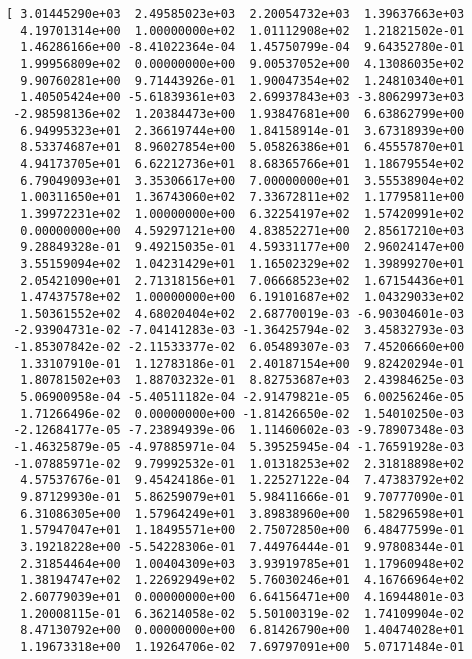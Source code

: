 \documentclass[11pt]{article}
\begin{document}
    \begin{Verbatim}[commandchars=\\\{\}]
[ 3.01445290e+03  2.49585023e+03  2.20054732e+03  1.39637663e+03
  4.19701314e+00  1.00000000e+02  1.01112908e+02  1.21821502e-01
  1.46286166e+00 -8.41022364e-04  1.45750799e-04  9.64352780e-01
  1.99956809e+02  0.00000000e+00  9.00537052e+00  4.13086035e+02
  9.90760281e+00  9.71443926e-01  1.90047354e+02  1.24810340e+01
  1.40505424e+00 -5.61839361e+03  2.69937843e+03 -3.80629973e+03
 -2.98598136e+02  1.20384473e+00  1.93847681e+00  6.63862799e+00
  6.94995323e+01  2.36619744e+00  1.84158914e-01  3.67318939e+00
  8.53374687e+01  8.96027854e+00  5.05826386e+01  6.45557870e+01
  4.94173705e+01  6.62212736e+01  8.68365766e+01  1.18679554e+02
  6.79049093e+01  3.35306617e+00  7.00000000e+01  3.55538904e+02
  1.00311650e+01  1.36743060e+02  7.33672811e+02  1.17795811e+00
  1.39972231e+02  1.00000000e+00  6.32254197e+02  1.57420991e+02
  0.00000000e+00  4.59297121e+00  4.83852271e+00  2.85617210e+03
  9.28849328e-01  9.49215035e-01  4.59331177e+00  2.96024147e+00
  3.55159094e+02  1.04231429e+01  1.16502329e+02  1.39899270e+01
  2.05421090e+01  2.71318156e+01  7.06668523e+02  1.67154436e+01
  1.47437578e+02  1.00000000e+00  6.19101687e+02  1.04329033e+02
  1.50361552e+02  4.68020404e+02  2.68770019e-03 -6.90304601e-03
 -2.93904731e-02 -7.04141283e-03 -1.36425794e-02  3.45832793e-03
 -1.85307842e-02 -2.11533377e-02  6.05489307e-03  7.45206660e+00
  1.33107910e-01  1.12783186e-01  2.40187154e+00  9.82420294e-01
  1.80781502e+03  1.88703232e-01  8.82753687e+03  2.43984625e-03
  5.06900958e-04 -5.40511182e-04 -2.91479821e-05  6.00256246e-05
  1.71266496e-02  0.00000000e+00 -1.81426650e-02  1.54010250e-03
 -2.12684177e-05 -7.23894939e-06  1.11460602e-03 -9.78907348e-03
 -1.46325879e-05 -4.97885971e-04  5.39525945e-04 -1.76591928e-03
 -1.07885971e-02  9.79992532e-01  1.01318253e+02  2.31818898e+02
  4.57537676e-01  9.45424186e-01  1.22527122e-04  7.47383792e+02
  9.87129930e-01  5.86259079e+01  5.98411666e-01  9.70777090e-01
  6.31086305e+00  1.57964249e+01  3.89838960e+00  1.58296598e+01
  1.57947047e+01  1.18495571e+00  2.75072850e+00  6.48477599e-01
  3.19218228e+00 -5.54228306e-01  7.44976444e-01  9.97808344e-01
  2.31854464e+00  1.00404309e+03  3.93919785e+01  1.17960948e+02
  1.38194747e+02  1.22692949e+02  5.76030246e+01  4.16766964e+02
  2.60779039e+01  0.00000000e+00  6.64156471e+00  4.16944801e-03
  1.20008115e-01  6.36214058e-02  5.50100319e-02  1.74109904e-02
  8.47130792e+00  0.00000000e+00  6.81426790e+00  1.40474028e+01
  1.19673318e+00  1.19264706e-02  7.69797091e+00  5.07171484e-01

\end{Verbatim}
\end{document}
